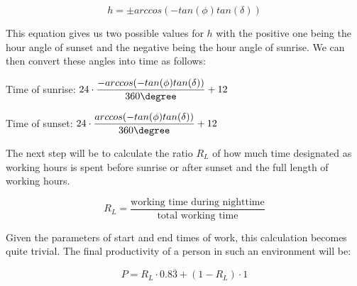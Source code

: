 $$h=\pm arccos(-tan(\phi)tan(\delta))$$

This equation gives us two possible values for $h$ with the positive one being the hour angle of sunset and the negative being the hour angle of sunrise. We can then convert these angles into time as follows:
\begin{center}
Time of sunrise: $24\cdot \dfrac{-arccos(-tan(\phi)tan(\delta))}{360\degree}+12$
\end{center}
\begin{center}
Time of sunset: $24\cdot \dfrac{arccos(-tan(\phi)tan(\delta))}{360\degree}+12$
\end{center}
The next step will be to calculate the ratio $R_L$ of how much time designated as working hours is spent before sunrise or after sunset and the full length of working hours.

$$R_L = \frac{\text{working time during nighttime}}{\text{total working time}}$$

Given the parameters of start and end times of work, this calculation becomes quite trivial. The final productivity of a person in such an environment will be:

$$P=R_L \cdot 0.8\overline{3}+(1-R_L)\cdot 1$$







